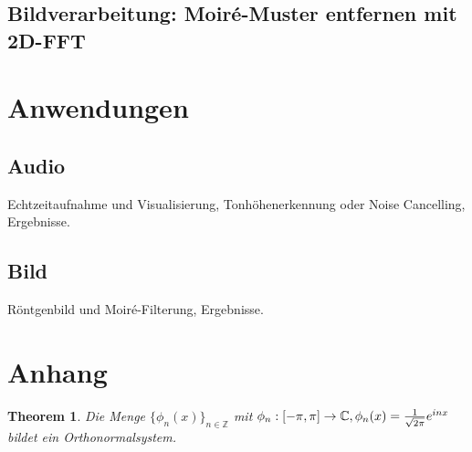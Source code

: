 \documentclass[a4paper,12pt]{article}
\newtheorem{theorem}{Theorem}[section]
\theoremstyle{definition}
\theoremstyle{remark}
\begin{document}
        \subsection{Bildverarbeitung: Moiré-Muster entfernen mit 2D-FFT}
        
        \section{Anwendungen}
        \subsection{Audio}
        Echtzeitaufnahme und Visualisierung, Tonhöhenerkennung oder Noise Cancelling, Ergebnisse.
        \subsection{Bild}
        Röntgenbild und Moiré-Filterung, Ergebnisse.
        
        \section{Anhang}
        \begin{theorem}\label{thm:orthonorm}
            Die Menge $\{\phi_n(x)\}_{n\in\mathbb{Z}}$ mit $\phi_n:[-\pi, \pi] \to \mathbb{C}, \\ \phi_n(x) = \frac{1}{\sqrt{2\pi}}e^{inx}$ bildet ein Orthonormalsystem.
        \end{theorem}
        
\end{document}
